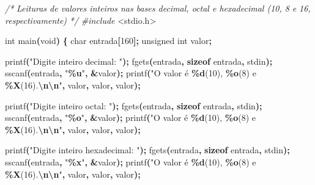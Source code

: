 \documentclass[
  11pt,
  a4paper,
]{scrbook}
\newenvironment{Shaded}{\begin{snugshade}}{\end{snugshade}}
\newcommand{\CommentTok}[1]{\textcolor[rgb]{0.56,0.35,0.01}{\textit{#1}}}
\newcommand{\DataTypeTok}[1]{\textcolor[rgb]{0.13,0.29,0.53}{#1}}
\newcommand{\DecValTok}[1]{\textcolor[rgb]{0.00,0.00,0.81}{#1}}
\newcommand{\ImportTok}[1]{#1}
\newcommand{\KeywordTok}[1]{\textcolor[rgb]{0.13,0.29,0.53}{\textbf{#1}}}
\newcommand{\NormalTok}[1]{#1}
\newcommand{\OperatorTok}[1]{\textcolor[rgb]{0.81,0.36,0.00}{\textbf{#1}}}
\newcommand{\PreprocessorTok}[1]{\textcolor[rgb]{0.56,0.35,0.01}{\textit{#1}}}
\newcommand{\SpecialCharTok}[1]{\textcolor[rgb]{0.81,0.36,0.00}{\textbf{#1}}}
\newcommand{\StringTok}[1]{\textcolor[rgb]{0.31,0.60,0.02}{#1}}
\begin{document}
\begin{Shaded}
\begin{Highlighting}[]
\CommentTok{/*}
\CommentTok{Leituras de valores inteiros nas bases decimal, octal e hexadecimal (10, 8}
\CommentTok{e 16, respectivamente)}
\CommentTok{*/}
\PreprocessorTok{\#include }\ImportTok{\textless{}stdio.h\textgreater{}}

\DataTypeTok{int}\NormalTok{ main}\OperatorTok{(}\DataTypeTok{void}\OperatorTok{)} \OperatorTok{\{}
    \DataTypeTok{char}\NormalTok{ entrada}\OperatorTok{[}\DecValTok{160}\OperatorTok{];}
    \DataTypeTok{unsigned} \DataTypeTok{int}\NormalTok{ valor}\OperatorTok{;}

\NormalTok{    printf}\OperatorTok{(}\StringTok{"Digite inteiro decimal: "}\OperatorTok{);}
\NormalTok{    fgets}\OperatorTok{(}\NormalTok{entrada}\OperatorTok{,} \KeywordTok{sizeof}\NormalTok{ entrada}\OperatorTok{,}\NormalTok{ stdin}\OperatorTok{);}
\NormalTok{    sscanf}\OperatorTok{(}\NormalTok{entrada}\OperatorTok{,} \StringTok{"}\SpecialCharTok{\%u}\StringTok{"}\OperatorTok{,} \OperatorTok{\&}\NormalTok{valor}\OperatorTok{);}
\NormalTok{    printf}\OperatorTok{(}\StringTok{"O valor é }\SpecialCharTok{\%d}\StringTok{(10), }\SpecialCharTok{\%o}\StringTok{(8) e }\SpecialCharTok{\%X}\StringTok{(16).}\SpecialCharTok{\textbackslash{}n\textbackslash{}n}\StringTok{"}\OperatorTok{,}\NormalTok{ valor}\OperatorTok{,}\NormalTok{ valor}\OperatorTok{,}\NormalTok{ valor}\OperatorTok{);}

\NormalTok{    printf}\OperatorTok{(}\StringTok{"Digite inteiro octal: "}\OperatorTok{);}
\NormalTok{    fgets}\OperatorTok{(}\NormalTok{entrada}\OperatorTok{,} \KeywordTok{sizeof}\NormalTok{ entrada}\OperatorTok{,}\NormalTok{ stdin}\OperatorTok{);}
\NormalTok{    sscanf}\OperatorTok{(}\NormalTok{entrada}\OperatorTok{,} \StringTok{"}\SpecialCharTok{\%o}\StringTok{"}\OperatorTok{,} \OperatorTok{\&}\NormalTok{valor}\OperatorTok{);}
\NormalTok{    printf}\OperatorTok{(}\StringTok{"O valor é }\SpecialCharTok{\%d}\StringTok{(10), }\SpecialCharTok{\%o}\StringTok{(8) e }\SpecialCharTok{\%X}\StringTok{(16).}\SpecialCharTok{\textbackslash{}n\textbackslash{}n}\StringTok{"}\OperatorTok{,}\NormalTok{ valor}\OperatorTok{,}\NormalTok{ valor}\OperatorTok{,}\NormalTok{ valor}\OperatorTok{);}

\NormalTok{    printf}\OperatorTok{(}\StringTok{"Digite inteiro hexadecimal: "}\OperatorTok{);}
\NormalTok{    fgets}\OperatorTok{(}\NormalTok{entrada}\OperatorTok{,} \KeywordTok{sizeof}\NormalTok{ entrada}\OperatorTok{,}\NormalTok{ stdin}\OperatorTok{);}
\NormalTok{    sscanf}\OperatorTok{(}\NormalTok{entrada}\OperatorTok{,} \StringTok{"}\SpecialCharTok{\%x}\StringTok{"}\OperatorTok{,} \OperatorTok{\&}\NormalTok{valor}\OperatorTok{);}
\NormalTok{    printf}\OperatorTok{(}\StringTok{"O valor é }\SpecialCharTok{\%d}\StringTok{(10), }\SpecialCharTok{\%o}\StringTok{(8) e }\SpecialCharTok{\%X}\StringTok{(16).}\SpecialCharTok{\textbackslash{}n\textbackslash{}n}\StringTok{"}\OperatorTok{,}\NormalTok{ valor}\OperatorTok{,}\NormalTok{ valor}\OperatorTok{,}\NormalTok{ valor}\OperatorTok{);}


\end{Highlighting}
\end{Shaded}
\end{document}
